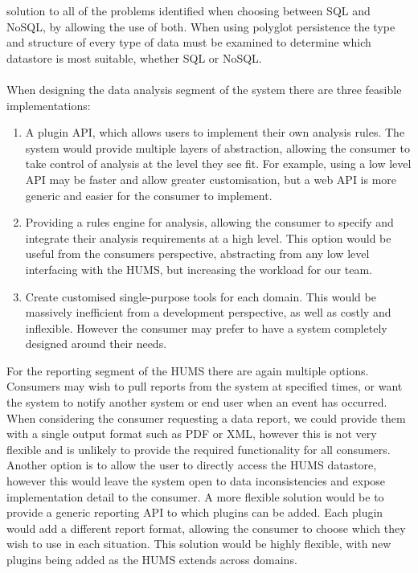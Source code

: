 \documentclass[10pt,a4paper]{article}
\begin{document}
solution to all of the problems identified when choosing between SQL and NoSQL,
by allowing the use of both. When using polyglot persistence the type and
structure of every type of data must be examined to determine which datastore is
most suitable, whether SQL or NoSQL.
\\ \\
When designing the data analysis segment of the system there are three feasible
implementations:
\begin{enumerate}
\item A plugin API, which allows users to implement their own analysis rules.
The system would provide multiple layers of abstraction, allowing the consumer
to take control of analysis at the level they see fit. For example, using a low
level API may be faster and allow greater customisation, but a web API is more
generic and easier for the consumer to implement.
\item Providing a rules engine for analysis, allowing the consumer to specify
and integrate their analysis requirements at a high level. This option would be
useful from the consumers perspective, abstracting from any low level
interfacing with the HUMS, but increasing the workload for our team.
\item Create customised single-purpose tools for each domain. This would be
massively inefficient from a development perspective, as well as costly and
inflexible. However the consumer may prefer to have a system completely designed
around their needs. \\
\end{enumerate}
For the reporting segment of the HUMS there are again multiple options.
Consumers may wish to pull reports from the system at specified times, or want
the system to notify another system or end user when an event has occurred. When
considering the consumer requesting a data report, we could provide them with a
single output format such as PDF or XML, however this is not very flexible and
is unlikely to provide the required functionality for all consumers. Another
option is to allow the user to directly access the HUMS datastore, however this
would leave the system open to data inconsistencies and expose implementation
detail to the consumer. A more flexible solution would be to provide a generic
reporting API to which plugins can be added. Each plugin would add a different
report format, allowing the consumer to choose which they wish to use in each
situation. This solution would be highly flexible, with new plugins being added
as the HUMS extends across domains.
\end{document}
